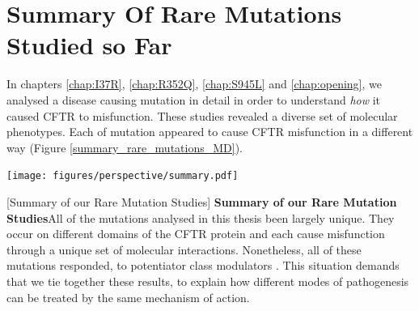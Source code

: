\section{Summary Of Rare Mutations Studied so Far}
In chapters \ref{chap:I37R}, \ref{chap:R352Q}, \ref{chap:S945L} and \ref{chap:opening}, we analysed a disease causing mutation in detail in order to understand \textit{how} it caused CFTR to misfunction. These studies revealed a diverse set of molecular phenotypes. Each of mutation appeared to cause CFTR misfunction in a different way (Figure \ref{summary_rare_mutations_MD}). 


	\begin{center}
	  \texttt{[image: figures/perspective/summary.pdf]}
	\end{center}
\begingroup
\captionsetup{singlelinecheck = false, justification=raggedright}
[Summary of our Rare Mutation Studies] {\textbf{Summary of our Rare Mutation Studies}}{All of the mutations analysed in this thesis been largely unique. They occur on different domains of the CFTR protein and each cause misfunction through a unique set of molecular interactions. Nonetheless, all of these mutations responded, to potentiator class modulators \cite{wong2022, wong2022a, kim2018, vanwilligen2019}. This situation demands that we tie together these results, to explain how different modes of pathogenesis can be treated by the same mechanism of action.} 
\label{summary_rare_mutations_MD}
\endgroup

